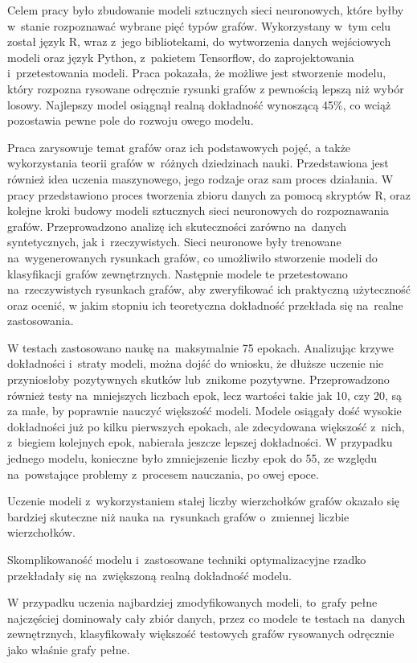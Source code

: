 Celem pracy było zbudowanie modeli sztucznych sieci neuronowych,
które byłby w~stanie rozpoznawać wybrane pięć typów grafów.
Wykorzystany w~tym celu został język R, wraz z~jego bibliotekami, do wytworzenia danych wejściowych modeli
oraz język Python, z~pakietem Tensorflow, do zaprojektowania i~przetestowania modeli.
Praca pokazała, że możliwe jest stworzenie modelu, który rozpozna rysowane odręcznie rysunki grafów
z pewnością lepszą niż wybór losowy.
Najlepszy model osiągnął realną dokładność wynoszącą 45\%,
co wciąż pozostawia pewne pole do rozwoju owego modelu.

Praca zarysowuje temat grafów oraz ich podstawowych pojęć,
a także wykorzystania teorii grafów w~różnych dziedzinach nauki.
Przedstawiona jest również idea uczenia maszynowego,
jego rodzaje oraz sam proces działania.
W pracy przedstawiono proces tworzenia zbioru danych za pomocą skryptów R,
oraz kolejne kroki budowy modeli sztucznych sieci neuronowych do rozpoznawania grafów.
Przeprowadzono analizę ich skuteczności zarówno na~danych syntetycznych, jak i~rzeczywistych.
Sieci neuronowe były trenowane na~wygenerowanych rysunkach grafów,
co umożliwiło stworzenie modeli do klasyfikacji grafów zewnętrznych.
Następnie modele te przetestowano na~rzeczywistych rysunkach grafów,
aby zweryfikować ich praktyczną użyteczność oraz ocenić,
w jakim stopniu ich teoretyczna dokładność przekłada się na~realne zastosowania.

W testach zastosowano naukę na~maksymalnie 75 epokach.
Analizując krzywe dokładności i~straty modeli, można dojść do wniosku,
że dłuższe uczenie nie przyniosłoby pozytywnych skutków lub~znikome pozytywne.
Przeprowadzono również testy na~mniejszych liczbach epok, lecz wartości takie jak 10, czy 20,
są za małe, by poprawnie nauczyć większość modeli.
Modele osiągały dość wysokie dokładności już po kilku pierwszych epokach,
ale zdecydowana większość z~nich, z~biegiem kolejnych epok, nabierała jeszcze lepszej dokładności.
W przypadku jednego modelu, konieczne było zmniejszenie liczby epok do 55,
ze względu na~powstające problemy z~procesem nauczania, po owej epoce.

Uczenie modeli z~wykorzystaniem stałej liczby wierzchołków grafów okazało się bardziej skuteczne
niż nauka na~rysunkach grafów o~zmiennej liczbie wierzchołków.

Skomplikowaność modelu i~zastosowane techniki optymalizacyjne rzadko przekładały się na~zwiększoną realną dokładność modelu.

W przypadku uczenia najbardziej zmodyfikowanych modeli, to~grafy pełne najczęściej dominowały cały zbiór danych,
przez co modele te testach na~danych zewnętrznych,
klasyfikowały większość testowych grafów rysowanych odręcznie jako właśnie grafy pełne.

